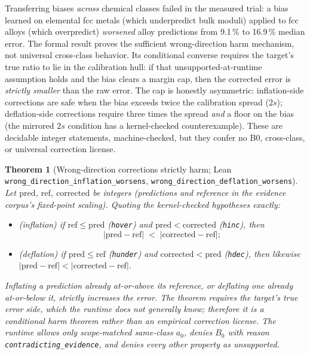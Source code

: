 \documentclass[11pt]{article}
\newtheorem{theorem}{Theorem}
\theoremstyle{definition}
\theoremstyle{remark}
\newcommand{\code}[1]{\texttt{#1}}
\begin{document}
Transferring biases \emph{across} chemical classes failed in the measured trial: a bias learned on elemental fcc metals (which underpredict bulk moduli) applied to fcc alloys (which overpredict) \emph{worsened} alloy predictions from 9.1\,\% to 16.9\,\% median error. The formal result proves the sufficient wrong-direction harm mechanism, not universal cross-class behavior. Its conditional converse requires the target's true ratio to lie in the calibration hull: if that unsupported-at-runtime assumption holds and the bias clears a margin cap, then the corrected error is \emph{strictly smaller} than the raw error. The cap is honestly asymmetric: inflation-side corrections are safe when the bias exceeds twice the calibration spread ($2s$); deflation-side corrections require three times the spread \emph{and} a floor on the bias (the mirrored $2s$ condition has a kernel-checked counterexample). These are decidable integer statements, machine-checked, but they confer no B0, cross-class, or universal correction license.

\begin{theorem}[Wrong-direction corrections strictly harm; Lean \code{wrong\_direction\_\allowbreak inflation\_worsens}, \code{wrong\_direction\_\allowbreak deflation\_worsens}]\label{thm:direction}
Let $\mathrm{pred}$, $\mathrm{ref}$, $\mathrm{corrected}$ be integers (predictions and reference in the evidence corpus's fixed-point scaling). Quoting the kernel-checked hypotheses exactly:
\begin{itemize}
\item[\textup{(i)}] \textup{(inflation)} if $\mathrm{ref} \le \mathrm{pred}$ \textup{(\code{hover})} and $\mathrm{pred} < \mathrm{corrected}$ \textup{(\code{hinc})}, then
\begin{equation}\label{eq:wrongdir}
\bigl|\mathrm{pred} - \mathrm{ref}\bigr| \;<\; \bigl|\mathrm{corrected} - \mathrm{ref}\bigr| ;
\end{equation}
\item[\textup{(ii)}] \textup{(deflation)} if $\mathrm{pred} \le \mathrm{ref}$ \textup{(\code{hunder})} and $\mathrm{corrected} < \mathrm{pred}$ \textup{(\code{hdec})}, then likewise
$\bigl|\mathrm{pred} - \mathrm{ref}\bigr| < \bigl|\mathrm{corrected} - \mathrm{ref}\bigr|$.
\end{itemize}
Inflating a prediction already at-or-above its reference, or deflating one already at-or-below it, strictly increases the error. The theorem requires the target's true error side, which the runtime does not generally know; therefore it is a conditional harm theorem rather than an empirical correction license. The runtime allows only scope-matched same-class $a_0$, denies $B_0$ with reason \code{contradicting\_evidence}, and denies every other property as unsupported.
\end{theorem}
\end{document}
